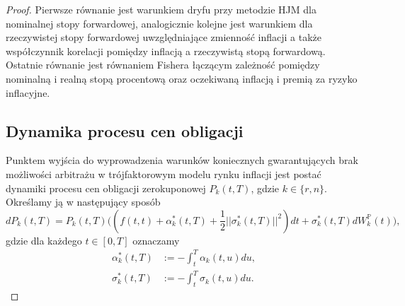 \documentclass{mini}
\theoremstyle{mythstyle}
\begin{document}
	\begin{proof}
		
		Pierwsze równanie  jest warunkiem dryfu przy metodzie HJM dla nominalnej stopy forwardowej, analogicznie kolejne jest warunkiem dla rzeczywistej stopy forwardowej uwzględniające zmienność inflacji a także współczynnik korelacji pomiędzy inflacją a rzeczywistą stopą forwardową. Ostatnie równanie jest równaniem Fishera łączącym zależność pomiędzy nominalną i realną stopą procentową oraz oczekiwaną inflacją i premią za ryzyko inflacyjne. 

	\subsection*{Dynamika procesu cen obligacji}
	Punktem wyjścia do wyprowadzenia warunków koniecznych gwarantujących brak możliwości arbitrażu w trójfaktorowym modelu rynku inflacji jest postać dynamiki procesu cen obligacji zerokuponowej $P_k(t,T)$, gdzie $k \in\{r,n\}$. Określamy ją w następujący sposób
	\begin{equation*}
	dP_k(t,T) = P_k(t,T) \bigg((f(t,t)+\alpha_k^*(t,T)+\frac{1}{2} ||\sigma_k^*(t,T)||^2 )dt +\sigma_k^*(t,T) dW_k^\mathbb{P}(t)\bigg),
	\end{equation*}
	gdzie dla każdego $t\in[0,T]$ oznaczamy
	\begin{align}
	\alpha_k^*(t,T) &:= - \int_{t}^{T} \alpha_k(t,u) du,\\
	\sigma_k^*(t,T) &:= - \int_{t}^{T} \sigma_k(t,u) du.
	\end{align}

\end{proof}
\end{document}
